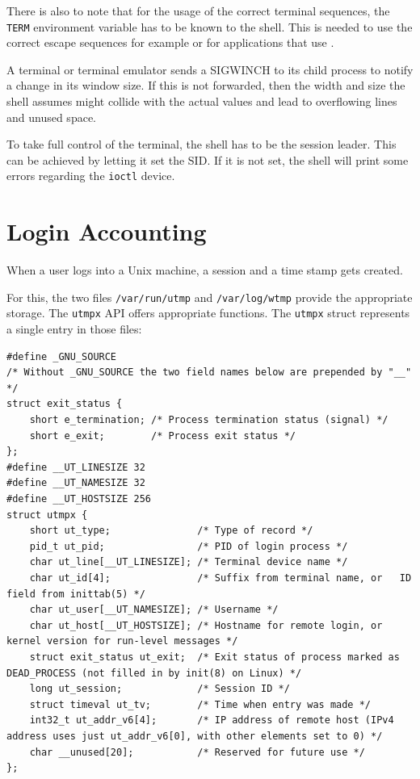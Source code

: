 \documentclass[10pt,a4paper,titlepage,twoside,english,final]{zhawreprt}
\begin{document}
There is also to note that for the usage of the correct terminal sequences, the \texttt{TERM} environment variable has to be known to the \gls{shell}.
This is needed to use the correct escape sequences for example or for applications that use \cite{ncurses}.

A terminal or terminal emulator sends a \gls{SIGWINCH} to its child process to notify a change in its window size.
If this is not forwarded, then the width and size the shell assumes might collide with the actual values and lead to overflowing lines and unused space.

To take full control of the terminal, the \gls{shell} has to be the session leader.
This can be achieved by letting it set the \gls{SID}.
If it is not set, the \gls{shell} will print some errors regarding the \texttt{ioctl} device.

\section{Login Accounting}\label{sec:DesignLoginAccounting}
When a user logs into a \gls{Unix} machine, a session and a time stamp gets created.

For this, the two files \texttt{/var/run/utmp} and \texttt{/var/log/wtmp} provide the appropriate storage.
The \texttt{utmpx} \gls{API} offers appropriate functions.
The \texttt{utmpx} struct represents a single entry in those files:
\setlistingC
\begin{lstlisting}[caption={Definition of the utmpx structure {\citep[p.819]{KerriskTLPI}}},label=lst:UtmpxDefinition]
#define _GNU_SOURCE
/* Without _GNU_SOURCE the two field names below are prepended by "__" */
struct exit_status {
	short e_termination; /* Process termination status (signal) */
	short e_exit; 		 /* Process exit status */
};
#define __UT_LINESIZE 32
#define __UT_NAMESIZE 32
#define __UT_HOSTSIZE 256
struct utmpx {
	short ut_type; 				 /* Type of record */
	pid_t ut_pid; 				 /* PID of login process */
	char ut_line[__UT_LINESIZE]; /* Terminal device name */
	char ut_id[4]; 				 /* Suffix from terminal name, or	ID field from inittab(5) */
	char ut_user[__UT_NAMESIZE]; /* Username */
	char ut_host[__UT_HOSTSIZE]; /* Hostname for remote login, or kernel version for run-level messages */
	struct exit_status ut_exit;  /* Exit status of process marked as DEAD_PROCESS (not filled in by init(8) on Linux) */
	long ut_session; 			 /* Session ID */
	struct timeval ut_tv; 		 /* Time when entry was made */
	int32_t ut_addr_v6[4]; 		 /* IP address of remote host (IPv4 address uses just ut_addr_v6[0], with other elements set to 0) */
	char __unused[20]; 			 /* Reserved for future use */
};
\end{lstlisting}
\end{document}
